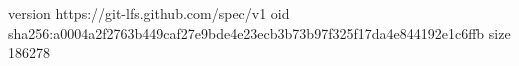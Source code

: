 version https://git-lfs.github.com/spec/v1
oid sha256:a0004a2f2763b449caf27e9bde4e23ecb3b73b97f325f17da4e844192e1c6ffb
size 186278

